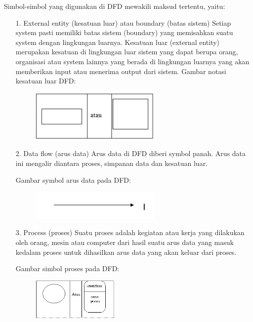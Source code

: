 \documentclass{jtetiproposalskripsi}
\begin{document}
Simbol-simbol yang digunakan di DFD mewakili maksud tertentu, yaitu:
\begin{itemize}

\item[1.]	External entity (kesatuan luar) atau boundary (batas sistem)
Setiap system pasti memiliki batas sistem (boundary) yang memisahkan suatu system dengan lingkungan luarnya. Kesatuan luar (external entity) merupakan kesatuan di lingkungan luar sistem yang dapat berupa orang, organisasi atau system lainnya yang berada di lingkungan luarnya yang akan memberikan input atau menerima output dari sistem.
Gambar notasi kesatuan luar DFD:

\begin{figure}[ht!]
\centering
\includegraphics[width=0.6\textwidth]{gambar/Eksternal}
\label{wsn}
\end{figure}

\item[2.]	Data flow (arus data)
Arus data di DFD diberi symbol panah. Arus data ini mengalir diantara proses, simpanan data dan kesatuan luar.

Gambar symbol arus data pada DFD:

\begin{figure}[ht!]
\centering
\includegraphics[width=0.6\textwidth]{gambar/Arus-Data}
\label{wsn}
\end{figure}

\item[3.]	Process (proses)
Suatu proses adalah kegiatan atau kerja yang dilakukan oleh orang, mesin atau computer dari hasil suatu arus data yang masuk kedalam proses untuk dihasilkan arus data yang akan keluar dari proses.

\newpage
Gambar simbol proses pada DFD:
\begin{figure}[ht!]
\centering
\includegraphics[width=0.4\textwidth]{gambar/Proses}
\label{wsn}
\end{figure}


\end{itemize}
\end{document}
